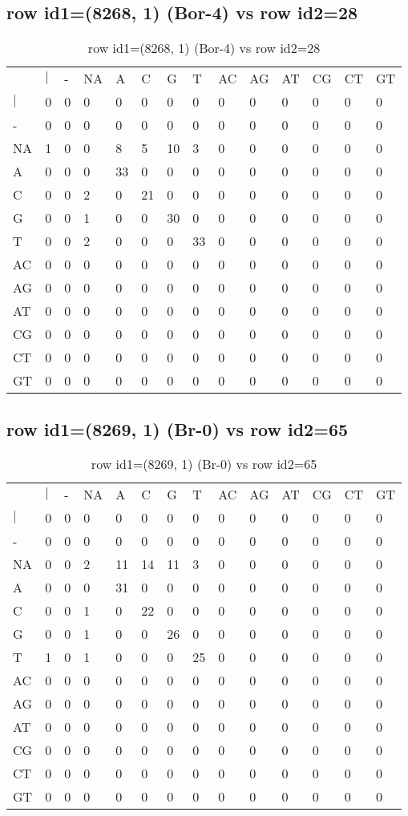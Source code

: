 \subsection{row id1=(8268, 1) (Bor-4) vs row id2=28}
\begin{center}
\begin{longtable}{|l|l|l|l|l|l|l|l|l|l|l|l|l|l|}
\caption{row id1=(8268, 1) (Bor-4) vs row id2=28} \label{table_dm224}\\
\hline
\\
\hline
&$|$&-&NA&A&C&G&T&AC&AG&AT&CG&CT&GT\\
$|$&0&0&0&0&0&0&0&0&0&0&0&0&0\\
-&0&0&0&0&0&0&0&0&0&0&0&0&0\\
NA&1&0&0&8&5&10&3&0&0&0&0&0&0\\
A&0&0&0&33&0&0&0&0&0&0&0&0&0\\
C&0&0&2&0&21&0&0&0&0&0&0&0&0\\
G&0&0&1&0&0&30&0&0&0&0&0&0&0\\
T&0&0&2&0&0&0&33&0&0&0&0&0&0\\
AC&0&0&0&0&0&0&0&0&0&0&0&0&0\\
AG&0&0&0&0&0&0&0&0&0&0&0&0&0\\
AT&0&0&0&0&0&0&0&0&0&0&0&0&0\\
CG&0&0&0&0&0&0&0&0&0&0&0&0&0\\
CT&0&0&0&0&0&0&0&0&0&0&0&0&0\\
GT&0&0&0&0&0&0&0&0&0&0&0&0&0\\
\hline
\end{longtable}
\end{center}

\subsection{row id1=(8269, 1) (Br-0) vs row id2=65}
\begin{center}
\begin{longtable}{|l|l|l|l|l|l|l|l|l|l|l|l|l|l|}
\caption{row id1=(8269, 1) (Br-0) vs row id2=65} \label{table_dm226}\\
\hline
\\
\hline
&$|$&-&NA&A&C&G&T&AC&AG&AT&CG&CT&GT\\
$|$&0&0&0&0&0&0&0&0&0&0&0&0&0\\
-&0&0&0&0&0&0&0&0&0&0&0&0&0\\
NA&0&0&2&11&14&11&3&0&0&0&0&0&0\\
A&0&0&0&31&0&0&0&0&0&0&0&0&0\\
C&0&0&1&0&22&0&0&0&0&0&0&0&0\\
G&0&0&1&0&0&26&0&0&0&0&0&0&0\\
T&1&0&1&0&0&0&25&0&0&0&0&0&0\\
AC&0&0&0&0&0&0&0&0&0&0&0&0&0\\
AG&0&0&0&0&0&0&0&0&0&0&0&0&0\\
AT&0&0&0&0&0&0&0&0&0&0&0&0&0\\
CG&0&0&0&0&0&0&0&0&0&0&0&0&0\\
CT&0&0&0&0&0&0&0&0&0&0&0&0&0\\
GT&0&0&0&0&0&0&0&0&0&0&0&0&0\\
\hline
\end{longtable}
\end{center}

